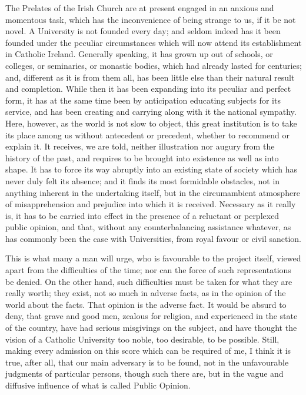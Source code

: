 The Prelates of the Irish Church are at present engaged in an
anxious and momentous task, which has the inconvenience of being
strange to us, if it be not novel. A University is not founded every
day; and seldom indeed has it been founded under the peculiar
circumstances which will now attend its establishment in Catholic
Ireland. Generally speaking, it has grown up out of schools, or
colleges, or seminaries, or monastic bodies, which had already lasted
for centuries; and, different as it is from them all, has been little
else than their natural result and completion. While then it has been
expanding into its peculiar and perfect form, it has at the same time
been by anticipation educating subjects for its service, and has been
creating and carrying along with it the national sympathy. Here,
however, as the world is not slow to object, this great institution is
to take its place among us without antecedent or precedent, whether to
recommend or explain it. It receives, we are told, neither
illustration nor augury from the history of the past, and requires to
be brought into existence as well as into shape. It has to force its
way abruptly into an existing state of society which has never duly
felt its absence; and it finds its most formidable obstacles, not in
anything inherent in the undertaking itself, but in the circumambient
atmosphere of misapprehension and prejudice into which it is received.
Necessary as it really is, it has to be carried into effect in the
presence of a reluctant or perplexed public opinion, and that, without
any counterbalancing assistance whatever, as has commonly been the
case with Universities, from royal favour or civil sanction.

This is what many a man will urge, who is favourable to the project
itself, viewed apart from the difficulties of the time; nor can the
force of such representations be denied. On the other hand, such
difficulties must be taken for what they are really worth; they exist,
not so much in adverse facts, as in the opinion of the world about the
facts. That opinion is the adverse fact. It would be absurd to deny,
that grave and good men, zealous for religion, and experienced in the
state of the country, have had serious misgivings on the subject,
and have thought the vision of a Catholic University too noble, too
desirable, to be possible. Still, making every admission on this score
which can be required of me, I think it is true, after all, that our
main adversary is to be found, not in the unfavourable judgments of
particular persons, though such there are, but in the vague and
diffusive influence of what is called Public Opinion.

